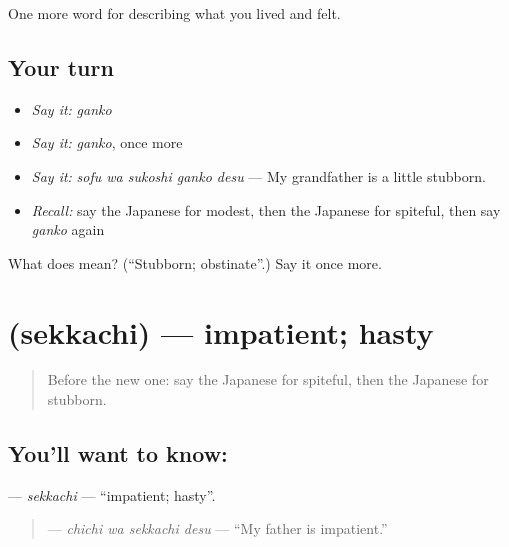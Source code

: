 \begin{grammarlens}[title={What you've built}]
One more word for describing what you lived and felt.
\end{grammarlens}

\subsection*{Your turn}
\begin{itemize}
\raggedright
  \item \emph{Say it:} \emph{ganko}
  \item \emph{Say it:} \emph{ganko}, once more
  \item \emph{Say it:} \emph{sofu wa sukoshi ganko desu} — My grandfather is a little stubborn.
  \item \emph{Recall:} say the Japanese for modest, then the Japanese for spiteful, then say \emph{ganko} again
\end{itemize}

\begin{tcolorbox}[breakable,colback=teal!4,colframe=teal!35!black,title={Before you move on}]
What does  mean? (\textquotedblleft{}Stubborn; obstinate\textquotedblright{}.) Say it once more.
\end{tcolorbox}
\section[\texorpdfstring{\ja{せっかち} (sekkachi)}{せっかち (sekkachi)}]{ (sekkachi) — impatient; hasty}

\label{lesson:JA-C438-sekkachi}



\begin{quote}
Before the new one: say the Japanese for spiteful, then the Japanese for stubborn.
\end{quote}

\subsection*{You'll want to know: }
\textbf{} — \emph{sekkachi} — \textquotedblleft{}impatient; hasty\textquotedblright{}.

\begin{quote}
\textbf{ } — \emph{chichi wa sekkachi desu} — \textquotedblleft{}My father is impatient.\textquotedblright{}
\end{quote}

